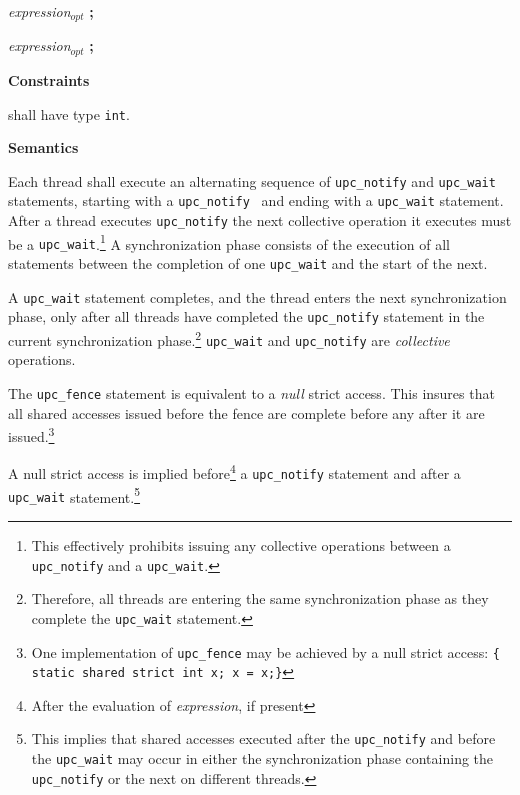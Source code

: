 \hspace{3em}{\bf upc\_wait} {\em expression$_{opt}$} {\bf ;}

\hspace{3em}{\bf upc\_barrier} {\em expression$_{opt}$} {\bf ;}

\hspace{3em}{\bf upc\_fence ;}

{\bf Constraints} 

 shall have
type {\tt int}. 


{\bf Semantics} 


\np Each thread shall execute an alternating sequence of
     {\tt upc\_notify} and {\tt upc\_wait} statements, starting with a
     {\tt upc\_notify } and ending with a {\tt upc\_wait} statement.   After a
     thread executes {\tt upc\_notify} the next collective operation it executes
     must be a {\tt upc\_wait}.\footnote{This effectively prohibits issuing any
     collective operations between a {\tt upc\_notify} and  a {\tt upc\_wait}.}
     A synchronization phase consists of the execution of all statements
     between the completion of one {\tt upc\_wait} and the start of
     the next.

\np A {\tt upc\_wait} statement completes, and the
     thread enters the next synchronization phase, only after all
     threads have completed the {\tt upc\_notify} statement in the
     current synchronization phase.\footnote{Therefore,
     all threads are entering the same synchronization phase as they
     complete the {\tt upc\_wait} statement.}  {\tt upc\_wait}
     and {\tt upc\_notify} are {\em collective} operations.

\np The {\tt upc\_fence} statement is equivalent to a {\em
    null} strict access.  This insures that all shared accesses
    issued before the fence are complete before any after it are
    issued.\footnote{One implementation of {\tt upc\_fence} 
    may be achieved by a null strict access:
     {\tt  \{ static shared strict int x; x = x;\}}} 

\np A null strict access is implied before\footnote{After the evaluation 
    of {\em expression}, if present} a {\tt upc\_notify} statement and 
    after a {\tt upc\_wait} 
    statement.\footnote{This implies that shared accesses executed 
    after the {\tt upc\_notify} and before the {\tt upc\_wait} may occur in 
    either the synchronization phase containing the {\tt upc\_notify} or 
    the next on different threads.}

